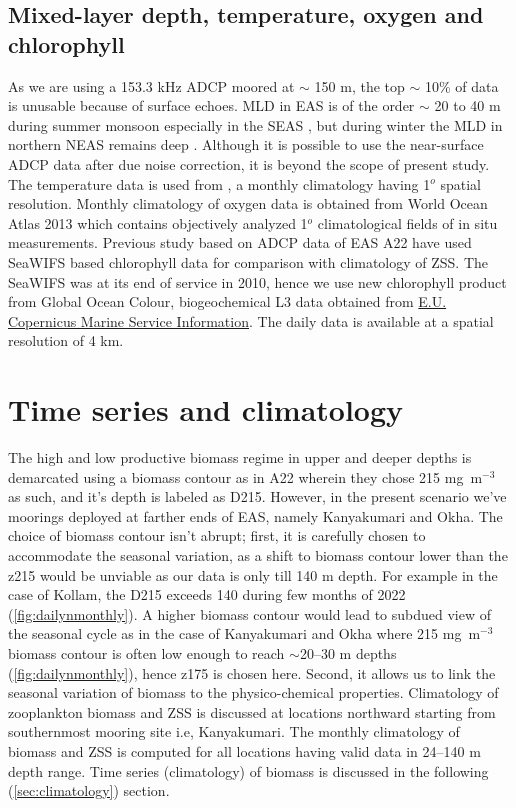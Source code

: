 \documentclass{article}
\begin{document}
	\subsection{Mixed-layer depth, temperature, oxygen and chlorophyll}
	As we are using a 153.3 kHz ADCP moored at $\sim$ 150 m, the top $\sim$ 10\% of data is unusable because of surface echoes. MLD in EAS is of the order $\sim$ 20 to 40 m during summer monsoon \citep{shetye1990hydrography,shankar2005hydrography,sreenivas2008monthly} especially in the SEAS \citep{shenoi2005hydrography}, but during winter the MLD in northern NEAS remains deep \citep{shankar2016inhibition}. Although it is possible to use the near-surface ADCP data after due noise correction, it is beyond the scope of present study. The temperature data is used from \citet{chatterjee2012new}, a monthly climatology having 1$^o$ spatial resolution. Monthly climatology of oxygen data is obtained from World Ocean Atlas 2013 \citep{garcia2013oxygen} which contains objectively analyzed 1$^o$ climatological fields of in situ measurements. Previous study based on ADCP data of EAS A22 have used SeaWIFS based chlorophyll data for comparison with climatology of ZSS. The SeaWIFS was at its end of service in 2010, hence we use new chlorophyll product from Global Ocean Colour, biogeochemical L3 data obtained from  \href{https://doi.org/10.48670/moi-00280}{E.U. Copernicus Marine Service Information}. The daily data is available at a spatial resolution of 4 km. 
	
	\section{Time series and climatology}
	The high and low productive biomass regime in upper and deeper depths is demarcated using a biomass contour as in A22 wherein they chose 215 mg~m$^{-3}$ as such, and it's depth is labeled as D215. However, in the present scenario we've moorings deployed at farther ends of EAS, namely Kanyakumari and Okha. The choice of biomass contour isn't abrupt; first, it is carefully chosen to accommodate the seasonal variation, as a shift to biomass contour lower than the z215 would be unviable as our data is only till 140 m depth. For example in the case of Kollam, the D215 exceeds 140 during few months of 2022 (\cref{fig:dailynmonthly}). A higher biomass contour would lead to subdued view of the seasonal cycle as in the case of Kanyakumari and Okha where 215 mg~m$^{-3}$ biomass contour is often low enough to reach $\sim$20--30 m depths (\cref{fig:dailynmonthly}), hence z175 is chosen here. Second, it allows us to link the seasonal variation of biomass to the physico-chemical properties. Climatology of zooplankton biomass and ZSS is discussed at locations northward starting from southernmost mooring site i.e, Kanyakumari. The monthly climatology of biomass and ZSS is computed for all locations having valid data in 24--140 m depth range. Time series (climatology) of biomass is discussed in the following (\autoref{sec:climatology}) section.
	
\end{document}
